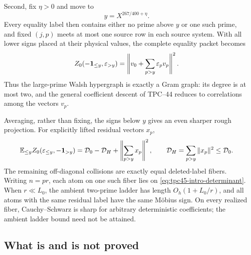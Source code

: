 Second, fix \(\eta>0\) and move to
\begin{equation}
 y=X^{267/400+\eta}.
 \label{eq:tpc45-intro-affine-threshold}
\end{equation}
Every equality label then contains either no prime above \(y\) or one
such prime, and fixed \((j,p)\) meets at most one source row in each
source system.  With all
lower signs placed at their physical values, the complete equality
packet becomes
\begin{equation}
 Z_0(-\mathbf 1_{\le y},\varepsilon_{>y})
 =\left\|v_0+\sum_{p>y}\varepsilon_pv_p\right\|^2.
 \label{eq:tpc45-intro-affine-form}
\end{equation}
Thus the large-prime Walsh hypergraph is exactly a Gram graph: its
degree is at most two, and the general coefficient descent of TPC--44
reduces to correlations among the vectors \(v_p\).

Averaging, rather than fixing, the signs below \(y\) gives an even
sharper rough projection.  For explicitly lifted residual vectors
\(x_p\),
\begin{equation}
 \mathbb E_{\le y}Z_0(\varepsilon_{\le y},-\mathbf 1_{>y})
 =\mathcal D_0-\mathcal D_H+
  \left\|\sum_{p>y}x_p\right\|^2,
 \qquad
 \mathcal D_H=\sum_{p>y}\|x_p\|^2\le\mathcal D_0.
 \label{eq:tpc45-intro-pure-Gram}
\end{equation}
The remaining off-diagonal collisions are exactly equal deleted-label
fibers.  Writing \(n=pr\), each atom on one such fiber lies on
\eqref{eq:tpc45-intro-determinant}.  When \(r\ll L_0\), the ambient
two-prime ladder has length \(O_h(1+L_0/r)\), and all atoms with the
same residual label have the same M\"obius sign.  On every realized
fiber, Cauchy--Schwarz is sharp for arbitrary deterministic
coefficients; the ambient ladder bound need not be attained.

\subsection{What is and is not proved}

